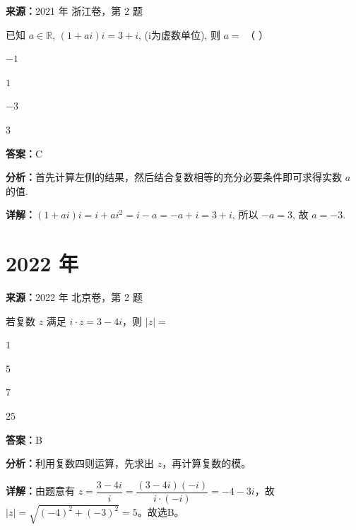 \begin{question}[points=4]
\textbf{来源：}2021 年 浙江卷，第 2 题\par
已知 $a \in \mathbb{R}$, $(1+ai)i=3+i$, (i为虚数单位), 则 $a=$ （   ）
\begin{choices}
  \item $-1$
  \item $1$
  \item $-3$
  \item $3$
\end{choices}
\begin{solution}
\textbf{答案：}C

\textbf{分析：}首先计算左侧的结果，然后结合复数相等的充分必要条件即可求得实数 $a$ 的值.

\textbf{详解：}$(1+ai)i = i + ai^2 = i - a = -a + i = 3 + i$, 所以 $-a=3$, 故 $a=-3$.
\end{solution}
\end{question}

\section*{2022 年}

\begin{question}[points=4]
\textbf{来源：}2022 年 北京卷，第 2 题\par
若复数 $z$ 满足 $i \cdot z = 3 - 4i$，则 $|z| =$
\begin{choices}
  \item $1$
  \item $5$
  \item $7$
  \item $25$
\end{choices}
\begin{solution}
\textbf{答案：}B

\textbf{分析：}利用复数四则运算，先求出 $z$，再计算复数的模。

\textbf{详解：}由题意有 $z = \dfrac{3-4i}{i} = \dfrac{(3-4i)(-i)}{i \cdot (-i)} = -4-3i$，故 $|z| = \sqrt{(-4)^2 + (-3)^2} = 5$。故选B。
\end{solution}
\end{question}

